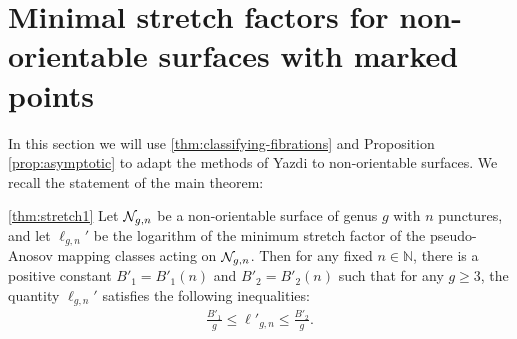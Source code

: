 \section{Minimal stretch factors for non-orientable surfaces with marked points}
\label{sec:application}

In this section we will use \autoref{thm:classifying-fibrations} and Proposition  \ref{prop:asymptotic} to adapt the methods of Yazdi \cite{yazdi2018pseudo} to non-orientable surfaces. We recall the statement of the main theorem:
\begin{manualtheorem}
  {\ref{thm:stretch1}}
Let $\mathcal{N}_{g,n}$ be a non-orientable surface of genus $g$ with $n$ punctures, and let $\ell_{g,n}'$ be the logarithm of
  the minimum stretch factor of the pseudo-Anosov mapping classes acting on $\mathcal{N}_{g,n}$.
  Then for any fixed $n \in \mathbb{N}$, there is a positive constant $B'_1 = B'_1(n)$ and $B'_2 = B'_2(n)$ such
  that for any $g \geq 3$,
  the quantity $\ell_{g,n}'$ satisfies the following inequalities:
  \begin{align*}
    \frac{B'_1}{g} \leq \ell'_{g,n} \leq \frac{B'_2}{g}.
  \end{align*}
\end{manualtheorem}




